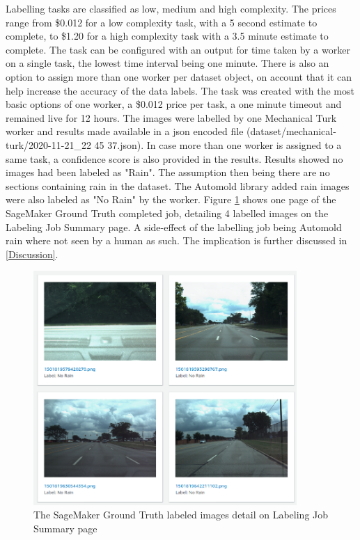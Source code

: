 Labelling tasks are classified as low, medium and high complexity. The prices range from \$0.012 for a low complexity task, with a 5 second estimate to complete, to \$1.20 for a high complexity task with a 3.5 minute estimate to complete.
The task can be configured with an output for time taken by a worker on a single task, the lowest time interval being one minute.
There is also an option to assign more than one worker per dataset object, on account that it can help increase the accuracy of the data labels.
The task was created with the most basic options of one worker, a \$0.012 price per task, a one minute timeout and remained live for 12 hours. 
The images were labelled by one Mechanical Turk worker and results made available in a json encoded file (dataset/mechanical-turk/2020-11-21\_22 45 37.json). In case more than one worker is assigned to a same task, a confidence score is also provided in the results. Results showed no images had been labeled as "Rain". The assumption then being there are no sections containing rain in the dataset. The Automold library added rain images were also labeled as "No Rain" by the worker. Figure \ref{fig:MechTurkLabeledImages} shows one page of the SageMaker Ground Truth completed job, detailing 4 labelled images on the Labeling Job Summary page. A side-effect of the labelling job being Automold rain where not seen by a human as such. The implication is further discussed in \ref{Discussion}.
\begin{figure}[h!]
\centering
\includegraphics[width=10cm]{Figures/MechTurkLabeledImages.png}
\caption{The SageMaker Ground Truth labeled images detail on Labeling Job Summary page}
\label{fig:MechTurkLabeledImages}
\end{figure}


